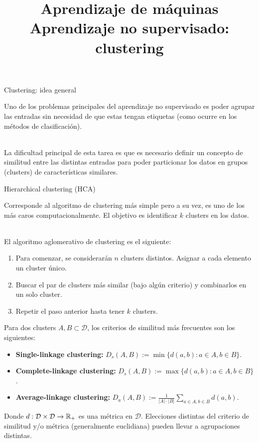 \documentclass[9pt]{beamer}
\title{\textbf{Aprendizaje de máquinas} \\ Aprendizaje no supervisado: clustering}
\begin{document}
\begin{frame}
  \titlepage
\end{frame}

\begin{frame}{Clustering: idea general}
	
	Uno de los problemas principales del aprendizaje no supervisado es poder agrupar las entradas sin necesidad de que estas tengan etiquetas (como ocurre en los métodos de clasificación).\\~\
	
	\pause
	La dificultad principal de esta tarea es que es necesario definir un concepto de similitud entre las distintas entradas para poder particionar los datos en grupos (clusters) de características similares.
	
\end{frame}

\begin{frame}{Hierarchical clustering (HCA)}
	
	Corresponde al algoritmo de clustering más simple pero a su vez, es uno de los más caros computacionalmente. El objetivo es identificar $k$ clusters en los datos. \\~\ \pause

 El algoritmo aglomerativo de clustering es el siguiente:

\begin{enumerate}
	\item Para comenzar, se considerarán $n$ clusters distintos. Asignar a cada elemento un cluster único.\pause
	\item Buscar el par de clusters más similar (bajo algún criterio) y combinarlos en un solo cluster.\pause
	\item Repetir el paso anterior hasta tener $k$ clusters.
\end{enumerate}
\pause
Para dos clusters $A,B\subset\mathcal{D}$, los criterios de similitud más frecuentes son los siguientes:

\begin{itemize}
	\item \textbf{Single-linkage clustering:} $D_s(A,B):=\min\{d(a,b):a\in A, b\in B\}$.\pause
	\item \textbf{Complete-linkage clustering:} $D_s(A,B):=\max\{d(a,b):a\in A, b\in B\}$.\pause
	\item \textbf{Average-linkage clustering:} $D_a(A,B):=\frac{1}{|A|\cdot|B|}\sum_{a\in A, b\in B} d(a,b)$.\pause
\end{itemize}

Donde $d:\mathcal{D}\times \mathcal{D}\to \mathbb{R}_+$ es una métrica en $\mathcal{D}$. Elecciones distintas del criterio de similitud y/o métrica (generalmente euclidiana) pueden llevar a agrupaciones distintas.
	
	
\end{frame}
\end{document}
